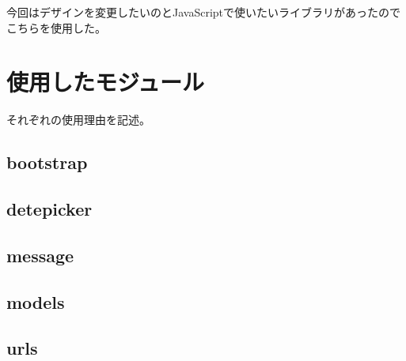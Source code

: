 今回はデザインを変更したいのとJavaScriptで使いたいライブラリがあったのでこちらを使用した。
\section{使用したモジュール}
それぞれの使用理由を記述。
\subsection{bootstrap}

\subsection{detepicker}

\subsection{message}

\subsection{models}

\subsection{urls}